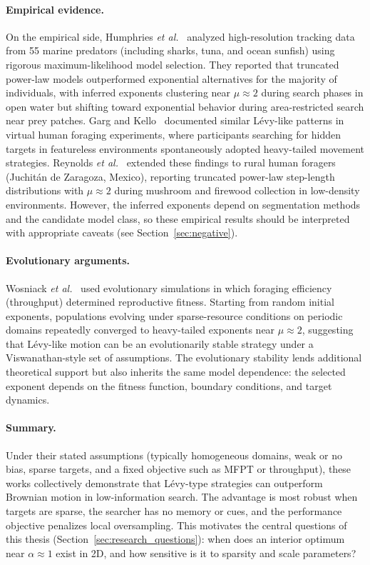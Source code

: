 \paragraph{Empirical evidence.}
On the empirical side, Humphries \emph{et al.}~\cite{humphries2012foraging} analyzed high-resolution tracking data from 55 marine predators (including sharks, tuna, and ocean sunfish) using rigorous maximum-likelihood model selection. They reported that truncated power-law models outperformed exponential alternatives for the majority of individuals, with inferred exponents clustering near $\mu \approx 2$ during search phases in open water but shifting toward exponential behavior during area-restricted search near prey patches. Garg and Kello~\cite{garg2021efficient} documented similar L\'evy-like patterns in virtual human foraging experiments, where participants searching for hidden targets in featureless environments spontaneously adopted heavy-tailed movement strategies. Reynolds \emph{et al.}~\cite{reynolds2018rural} extended these findings to rural human foragers (Juchit\'an de Zaragoza, Mexico), reporting truncated power-law step-length distributions with $\mu \approx 2$ during mushroom and firewood collection in low-density environments. However, the inferred exponents depend on segmentation methods and the candidate model class, so these empirical results should be interpreted with appropriate caveats (see Section~\ref{sec:negative}).

\paragraph{Evolutionary arguments.}
Wosniack \emph{et al.}~\cite{wosniack2017evolutionary} used evolutionary simulations in which foraging efficiency (throughput) determined reproductive fitness. Starting from random initial exponents, populations evolving under sparse-resource conditions on periodic domains repeatedly converged to heavy-tailed exponents near $\mu \approx 2$, suggesting that L\'evy-like motion can be an evolutionarily stable strategy under a Viswanathan-style set of assumptions. The evolutionary stability lends additional theoretical support but also inherits the same model dependence: the selected exponent depends on the fitness function, boundary conditions, and target dynamics.

\paragraph{Summary.}
Under their stated assumptions (typically homogeneous domains, weak or no bias, sparse targets, and a fixed objective such as MFPT or throughput), these works collectively demonstrate that L\'evy-type strategies can outperform Brownian motion in low-information search. The advantage is most robust when targets are sparse, the searcher has no memory or cues, and the performance objective penalizes local oversampling. This motivates the central questions of this thesis (Section~\ref{sec:research_questions}): when does an interior optimum near $\alpha \approx 1$ exist in 2D, and how sensitive is it to sparsity and scale parameters?

